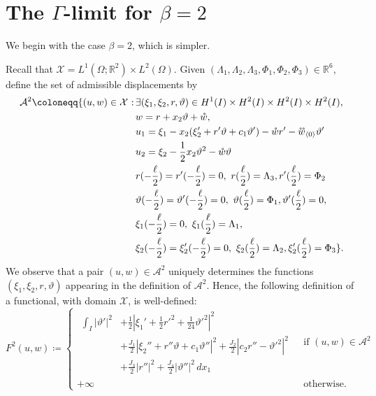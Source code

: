 \documentclass[a4, 11pt, reqno, final]{amsart}
\newcommand{\calA}{\mathcal{A}}
\newcommand{\calX}{\mathcal{X}}
\newcommand{\bbR}{\mathbb{R}}
\newcommand\ringring[1]{%
	{%
		\mathop{\kern0pt #1}\limits^{%
			\vbox to-1.85ex{
				\kern-2ex %
				\hbox to 0pt{\hss\normalfont\kern.1em \r{}\kern-.45em \r{}\hss}%
				\vss %
			}%
		}%
	}%
}
\theoremstyle{plain}%
\DeclareMathOperator{\st}{\,:\,}
\begin{document}
	\section{The $\Gamma$-limit for $\beta=2$}\label{sec:gamma2}

	We begin with the case $\beta = 2$, which is simpler.

	Recall that $\mathcal{X} = L^1(\Omega; \mathbb{R}^2) \times L^2(\Omega)$. Given $(\Lambda_1, \Lambda_2, \Lambda_3, \Phi_1, \Phi_2, \Phi_3) \in \bbR^6$, define the set of admissible displacements by
	$$
	\begin{aligned}
		\calA^{2} \coloneqq
		\{(u,w) \in \calX \st & \exists   (\xi_1, \xi_2, r, \vartheta) \in H^1(I) \times H^2(I)\times H^2(I)\times H^2(I), \\
		&w = r + x_2\vartheta + \mathring{w}, \\
		&u_{1} =\xi_1 -x_2(\xi_2'+r'\vartheta + c_1\vartheta') - \mathring{w} r'   -\ringring{w}_{\langle 0 \rangle}\vartheta'\\
		&u_{2}=\xi_2 - \frac12 x_2 \vartheta^2 - \mathring{w}\vartheta\\
		& r(-\frac{\ell}{2})=r'(-\frac{\ell}{2})=0, \ r(\frac{\ell}{2})=\Lambda_3, r'(\frac{\ell}{2})=\Phi_2\\
		& \vartheta(-\frac{\ell}{2})=\vartheta'(-\frac{\ell}{2})=0, \ \vartheta(\frac{\ell}{2})=\Phi_1, \vartheta'(\frac{\ell}{2})=0, \\
		& \xi_1(-\frac{\ell}{2})=0, \ \xi_1(\frac{\ell}{2})=\Lambda_1,\\
		&\xi_2(-\frac{\ell}{2})=\xi_2'(-\frac{\ell}{2})=0, \ \xi_2(\frac{\ell}{2})=\Lambda_2, \xi_2'(\frac{\ell}{2})=\Phi_3\}.
	\end{aligned}
	$$
	We observe that a pair $(u, w) \in \mathcal{A}^{2}$ uniquely determines the functions $(\xi_1, \xi_2, r, \vartheta)$ appearing in the definition of $\mathcal{A}^{2}$. Hence, the following definition of a functional, with domain $\mathcal{X}$, is well-defined:
	$$
	F^{2}(u,w) \coloneqq
	\begin{cases}
		\begin{aligned}
			\int_I |\vartheta'|^2 &+ \frac12 |\xi_1'+ \frac12 r'^2 + \frac{1}{24}\vartheta'^2|^2
			\\ & +\frac{J_1}{2} |\xi_2'' + r''\vartheta + c_1\vartheta''|^2  +\frac{J_2}{2} |c_2 r'' - \vartheta'^2|^2\\
			&  +\frac{J_3}{2} |r''|^2  +\frac{J_4}{2} |\vartheta''|^2 \, dx_1 \end{aligned}
			& \text{ if }  (u,w) \in \calA^{2}\\
			+\infty & \text{ otherwise}.
	\end{cases}
	$$
\end{document}
